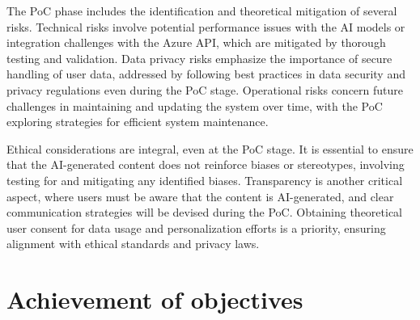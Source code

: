\documentclass[%
pdftex,
oneside,			%
11pt,				%
parskip=half,		%
headheight = 12pt,	%
headsepline,		%
footsepline,		%
footheight = 16pt,	%
abstracton,		%
DIV=calc,		%
BCOR=8mm,		%
headinclude=false,	%
footinclude=false,	%
listof=totoc,		%
toc=bibliography,	%
]{scrreprt}	%
\begin{document}
            The PoC phase includes the identification and theoretical mitigation of several risks. 
            Technical risks involve potential performance issues with the AI models or integration challenges with the Azure API, which are mitigated by thorough testing and validation. 
            Data privacy risks emphasize the importance of secure handling of user data, addressed by following best practices in data security and privacy regulations even during the PoC stage. 
            Operational risks concern future challenges in maintaining and updating the system over time, with the PoC exploring strategies for efficient system maintenance.

            Ethical considerations are integral, even at the PoC stage. 
            It is essential to ensure that the AI-generated content does not reinforce biases or stereotypes, involving testing for and mitigating any identified biases. 
            Transparency is another critical aspect, where users must be aware that the content is AI-generated, and clear communication strategies will be devised during the PoC. 
            Obtaining theoretical user consent for data usage and personalization efforts is a priority, ensuring alignment with ethical standards and privacy laws.

        \newpage

\chapter{Achievement of objectives}

\end{document}
